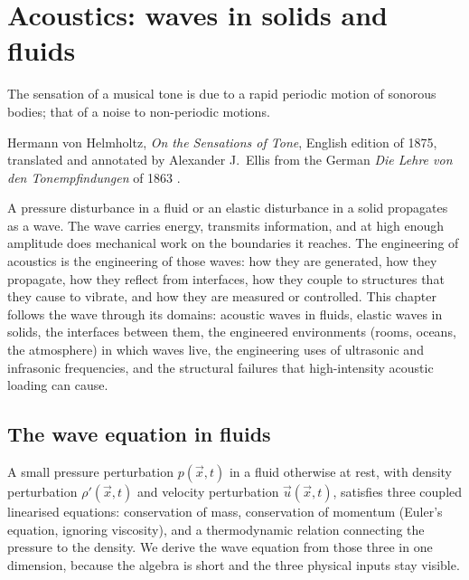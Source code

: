 \chapter{Acoustics: waves in solids and fluids}
\label{vol03:ch07}

\epigraph{The sensation of a musical tone is due to a rapid periodic
motion of sonorous bodies; that of a noise to non-periodic motions.}{
Hermann von Helmholtz, \emph{On the Sensations of Tone}, English
edition of 1875, translated and annotated by Alexander J.\ Ellis from
the German \emph{Die Lehre von den Tonempfindungen} of 1863
\cite[p.~8]{hist:helmholtz1863}.}


\noindent
A pressure disturbance in a fluid or an elastic disturbance in a
solid propagates as a wave. The wave carries energy, transmits
information, and at high enough amplitude does mechanical work on
the boundaries it reaches. The engineering of acoustics is the
engineering of those waves: how they are generated, how they
propagate, how they reflect from interfaces, how they couple to
structures that they cause to vibrate, and how they are measured or
controlled. This chapter follows the wave through its domains:
acoustic waves in fluids, elastic waves in solids, the interfaces
between them, the engineered environments (rooms, oceans, the
atmosphere) in which waves live, the engineering uses of ultrasonic
and infrasonic frequencies, and the structural failures that
high-intensity acoustic loading can cause.

\section{The wave equation in fluids}

A small pressure perturbation $p(\vec{x}, t)$ in a fluid otherwise at
rest, with density perturbation $\rho'(\vec{x}, t)$ and velocity
perturbation $\vec{u}(\vec{x}, t)$, satisfies three coupled
linearised equations: conservation of mass, conservation of momentum
(Euler's equation, ignoring viscosity), and a thermodynamic relation
connecting the pressure to the density. We derive the wave equation
from those three in one dimension, because the algebra is short and the
three physical inputs stay visible.

